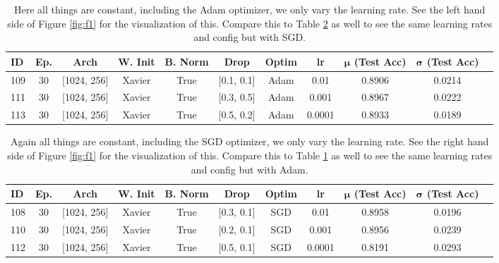 \documentclass[10pt]{amsart}
\begin{document}
\begin{table}[h]
    \centering
    \begin{tabular}{|l|c|c|c|c|c|c|c|c|c|c|} %
        \hline
        \textbf{ID} & \textbf{Ep.}
        & \textbf{Arch} & \textbf{W. Init}
        & \textbf{B. Norm} & \textbf{Drop}
        & \textbf{Optim} & \textbf{lr}
	& \textbf{$\bm \mu$ (Test Acc)}
        & \textbf{$\bm \sigma$ (Test Acc)} \\ 
        \hline
        109 & 30 & [1024, 256]  & Xavier & True & [0.1, 0.1] & Adam & 0.01 & 0.8906 & 0.0214 \\
        \hline
        111 & 30 & [1024, 256]  & Xavier & True & [0.3, 0.5] & Adam & 0.001 & 0.8967 & 0.0222 \\
        \hline
        113 & 30 & [1024, 256]  & Xavier & True & [0.5, 0.2] & Adam & 0.0001 & 0.8933 & 0.0189 \\  
        \hline
    \end{tabular}
    \caption{Here all things are constant, including the Adam optimizer, we only vary the learning rate.
    See the left hand side of Figure \ref{fig:f1} for the visualization of this.
    Compare this to Table \ref{tab:tab3} as well to see the same learning rates and config but with SGD.}
    \label{tab:tab2}
\end{table}

\begin{table}[h]
    \centering
    \begin{tabular}{|l|c|c|c|c|c|c|c|c|c|c|} %
        \hline
        \textbf{ID} & \textbf{Ep.}
        & \textbf{Arch} & \textbf{W. Init}
        & \textbf{B. Norm} & \textbf{Drop}
        & \textbf{Optim} & \textbf{lr}
	& \textbf{$\bm \mu$ (Test Acc)}
        & \textbf{$\bm \sigma$ (Test Acc)} \\ 
        \hline
        108 & 30 & [1024, 256]  & Xavier & True & [0.3, 0.1] & SGD & 0.01 & 0.8958 & 0.0196 \\
        \hline
        110 & 30 & [1024, 256]  & Xavier & True & [0.2, 0.1] & SGD & 0.001 & 0.8956 & 0.0239 \\
        \hline
        112 & 30 & [1024, 256]  & Xavier & True & [0.5, 0.1] & SGD & 0.0001 & 0.8191 & 0.0293 \\  
        \hline
    \end{tabular}
    \caption{
    Again all things are constant, including the SGD optimizer, we only vary the learning rate.
    See the right hand side of Figure \ref{fig:f1} for the visualization of this.
    Compare this to Table \ref{tab:tab2} as well to see the same learning rates and config but with Adam.
    }
    \label{tab:tab3}
\end{table}
\end{document}
